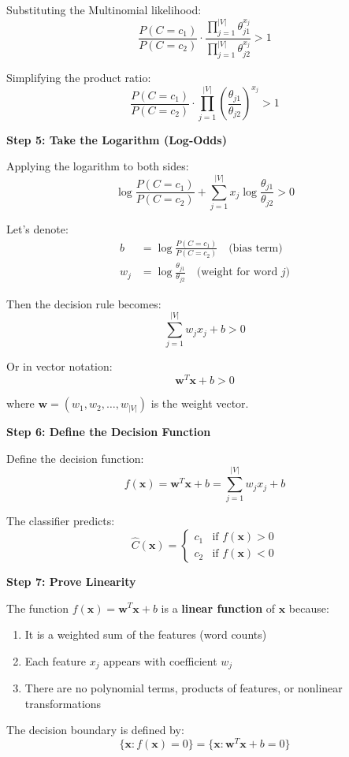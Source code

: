 \documentclass[12pt]{article}
\begin{document}
\begin{solution}
Substituting the Multinomial likelihood:
\[
\frac{P(C = c_1)}{P(C = c_2)} \cdot \frac{\prod_{j=1}^{|V|} \theta_{j1}^{x_j}}{\prod_{j=1}^{|V|} \theta_{j2}^{x_j}} > 1
\]

Simplifying the product ratio:
\[
\frac{P(C = c_1)}{P(C = c_2)} \cdot \prod_{j=1}^{|V|} \left( \frac{\theta_{j1}}{\theta_{j2}} \right)^{x_j} > 1
\]

\textbf{Step 5: Take the Logarithm (Log-Odds)}

Applying the logarithm to both sides:
\[
\log \frac{P(C = c_1)}{P(C = c_2)} + \sum_{j=1}^{|V|} x_j \log \frac{\theta_{j1}}{\theta_{j2}} > 0
\]

Let's denote:
\begin{align*}
b &= \log \frac{P(C = c_1)}{P(C = c_2)} \quad \text{(bias term)} \\
w_j &= \log \frac{\theta_{j1}}{\theta_{j2}} \quad \text{(weight for word } j\text{)}
\end{align*}

Then the decision rule becomes:
\[
\sum_{j=1}^{|V|} w_j x_j + b > 0
\]

Or in vector notation:
\[
\mathbf{w}^T \mathbf{x} + b > 0
\]

where $\mathbf{w} = (w_1, w_2, \ldots, w_{|V|})$ is the weight vector.

\textbf{Step 6: Define the Decision Function}

Define the decision function:
\[
f(\mathbf{x}) = \mathbf{w}^T \mathbf{x} + b = \sum_{j=1}^{|V|} w_j x_j + b
\]

The classifier predicts:
\[
\hat{C}(\mathbf{x}) = \begin{cases}
c_1 & \text{if } f(\mathbf{x}) > 0 \\
c_2 & \text{if } f(\mathbf{x}) < 0
\end{cases}
\]

\textbf{Step 7: Prove Linearity}

The function $f(\mathbf{x}) = \mathbf{w}^T \mathbf{x} + b$ is a \textbf{linear function} of $\mathbf{x}$ because:
\begin{enumerate}
    \item It is a weighted sum of the features (word counts)
    \item Each feature $x_j$ appears with coefficient $w_j$
    \item There are no polynomial terms, products of features, or nonlinear transformations
\end{enumerate}

The decision boundary is defined by:
\[
\{\mathbf{x} : f(\mathbf{x}) = 0\} = \{\mathbf{x} : \mathbf{w}^T \mathbf{x} + b = 0\}
\]


\end{solution}
\end{document}
